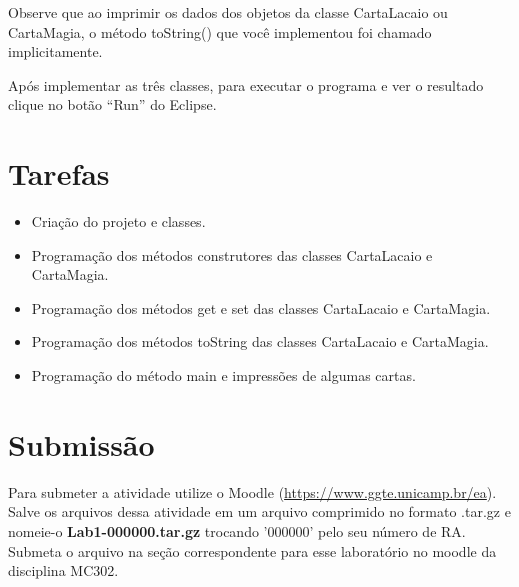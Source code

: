 \documentclass[10pt]{article}
\begin{document}


Observe que ao imprimir os dados dos objetos da classe CartaLacaio ou CartaMagia, o método toString() que você implementou foi chamado implicitamente. 

Após implementar as três classes, para executar o programa e ver o resultado clique no botão ``Run'' do Eclipse.

\section{Tarefas}

\begin{itemize}
	\item Criação do projeto e classes.
	\item Programação dos métodos construtores das classes CartaLacaio e CartaMagia.
	\item Programação dos métodos get e set das classes CartaLacaio e CartaMagia.
	\item Programação dos métodos toString das classes CartaLacaio e CartaMagia.
	\item Programação do método main e impressões de algumas cartas.
\end{itemize}

\section{Submissão}

Para submeter a atividade utilize o Moodle (\url{https://www.ggte.unicamp.br/ea}). Salve os arquivos dessa atividade em um arquivo comprimido no formato .tar.gz e nomeie-o \textbf{Lab1-000000.tar.gz} trocando '000000' pelo seu número de RA. Submeta o arquivo na seção correspondente para esse laboratório no moodle da disciplina MC302.
\end{document}
